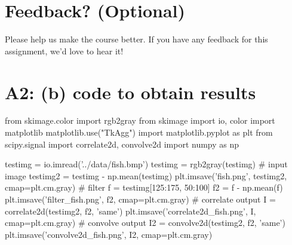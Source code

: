 
\pagebreak
\section*{Feedback? (Optional)}
Please help us make the course better. If you have any feedback for this assignment, we'd love to hear it!


\pagebreak
\section*{A2: (b) code to obtain results}
\begin{python}
from skimage.color import rgb2gray
from skimage import io, color
import matplotlib
matplotlib.use("TkAgg")
import matplotlib.pyplot as plt
from scipy.signal import correlate2d, convolve2d
import numpy as np

testimg = io.imread('../data/fish.bmp')
testimg = rgb2gray(testimg)
# input image
testimg2 = testimg - np.mean(testimg)
plt.imsave('fish.png', testimg2, cmap=plt.cm.gray)
# filter 
f = testimg[125:175, 50:100]
f2 = f - np.mean(f)
plt.imsave('filter_fish.png', f2, cmap=plt.cm.gray)
# correlate output
I = correlate2d(testimg2, f2, 'same')
plt.imsave('correlate2d_fish.png', I, cmap=plt.cm.gray)
# convolve output
I2 = convolve2d(testimg2, f2, 'same')
plt.imsave('convolve2d_fish.png', I2, cmap=plt.cm.gray)
\end{python}

\newpage

